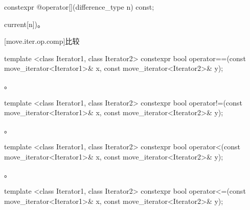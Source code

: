 %
%
\begin{itemdecl}
constexpr @\unspec@ operator[](difference_type n) const;
\end{itemdecl}

\begin{itemdescr}
\pnum
\returns {}current[n])。
\end{itemdescr}

[move.iter.op.comp]{比较}

%
%
\begin{itemdecl}
template <class Iterator1, class Iterator2>
constexpr bool operator==(const move_iterator<Iterator1>& x, const move_iterator<Iterator2>& y);
\end{itemdecl}

\begin{itemdescr}
\pnum
\returns {}。
\end{itemdescr}

%
%
\begin{itemdecl}
template <class Iterator1, class Iterator2>
constexpr bool operator!=(const move_iterator<Iterator1>& x, const move_iterator<Iterator2>& y);
\end{itemdecl}

\begin{itemdescr}
\pnum
\returns {}。
\end{itemdescr}

%
%
\begin{itemdecl}
template <class Iterator1, class Iterator2>
constexpr bool operator<(const move_iterator<Iterator1>& x, const move_iterator<Iterator2>& y);
\end{itemdecl}

\begin{itemdescr}
\pnum
\returns {}。
\end{itemdescr}

%
%
\begin{itemdecl}
template <class Iterator1, class Iterator2>
constexpr bool operator<=(const move_iterator<Iterator1>& x, const move_iterator<Iterator2>& y);
\end{itemdecl}

